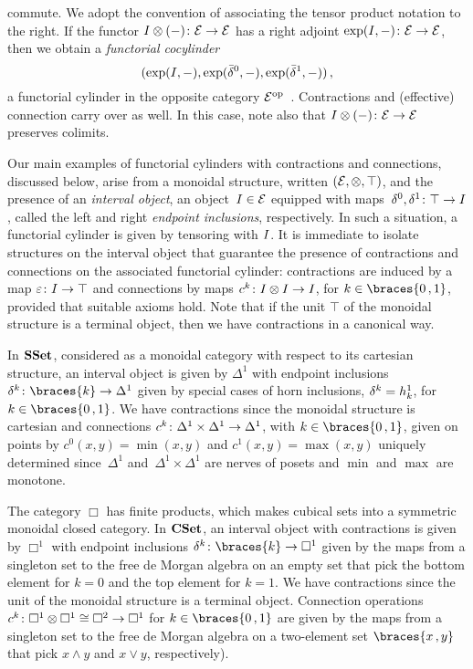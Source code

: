 \documentclass[reqno,10pt,a4paper,oneside,draft]{amsart}
\begin{document}
commute.
We adopt the convention of associating the tensor product notation to the right.
If the functor $I\otimes (-) \colon \mathcal{E} \to \mathcal{E}$ has a right adjoint
$\exp(I, -) \colon \mathcal{E} \to \mathcal{E}$, then we obtain a \emph{functorial cocylinder}
\[
(\exp(I, -), \exp(\bar{\delta}^0, -), \exp(\bar{\delta}^1, -)) \, ,
\]
\ie a functorial cylinder in the opposite category $\mathcal{E}^{\operatorname{op}}$~\cite{kamps-porter:homotopy}.
Contractions and (effective) connection carry over as well.
In this case, note also that $I\otimes (-) \colon \mathcal{E} \to \mathcal{E}$ preserves colimits.

Our main examples of functorial cylinders with contractions and connections, discussed below, arise from a monoidal structure, written $(\mathcal{E}, \otimes, \top)$, and the presence of an \emph{interval object}, \ie an object~$I \in \mathcal{E}$ equipped with maps~$\delta^0, \delta^1 \colon \top \to I$, called the left and right \emph{endpoint inclusions}, respectively.
In such a situation, a functorial cylinder is given by tensoring with $I$.
It is immediate to isolate structures on the interval object that guarantee the presence of contractions and connections on the associated functorial cylinder: contractions are induced by a map $\varepsilon \colon I \to \top$ and connections by maps $c^k \colon I \otimes I \to I$, for $k \in \braces{0\,, 1}$, provided that suitable axioms hold.
Note that if the unit $\top$ of the monoidal structure is a terminal object, then we have contractions in a canonical way.

\begin{example} \label{exa:cyl-in-sset}
In $\mathbf{SSet}$, considered as a monoidal category with respect to its cartesian structure, an interval object is given by $\Delta^1$ with endpoint inclusions~$\kcyl  \co \braces{k} \to \Delta^1$ given by special cases of horn inclusions, $\delta^k = h^1_k$, for $k \in \braces{0\,, 1}$.
We have contractions since the monoidal structure is cartesian and connections $c^k \colon \Delta^1 \times \Delta^1 \to \Delta^1$, with $k \in \braces{0\,, 1}$, given on points by $c^0(x, y) = \min(x, y)$ and $c^1(x, y) = \max(x, y)$ uniquely determined since~$\Delta^1$ and~$\Delta^1 \times \Delta^1$ are nerves of posets and $\min$ and $\max$ are monotone.
\end{example}

\begin{example} \label{exa:cyl-in-cuset}
The category $\Box$ has finite products, which makes cubical sets into a symmetric monoidal closed category.
In $\mathbf{CSet}$, an interval object with contractions is given by $\Box^1$ with endpoint inclusions $\kcyl \co \braces{k} \to \Box^1$ given by the maps from a singleton set to the free de Morgan algebra on an empty set that pick the bottom element for $k = 0$ and the top element for $k =1$.
We have contractions since the unit of the monoidal structure is a terminal object.
Connection operations $c^k \colon \Box^1 \otimes \Box^1 \cong \Box^2 \to \Box^1$ for $k \in \braces{0\,, 1}$ are given by the maps from a singleton set to the free de Morgan algebra on a two-element set $\braces{x\,, y}$ that pick $x \wedge y$ and $x \vee y$, respectively).
\end{example}
\end{document}
